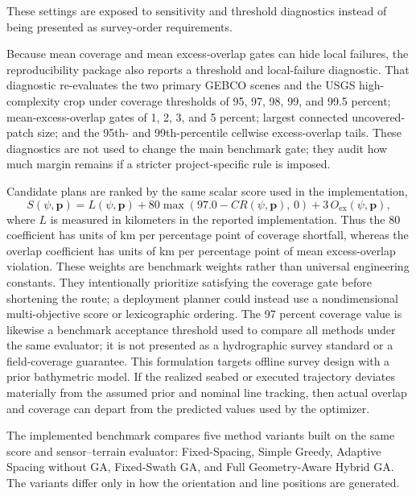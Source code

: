 \documentclass[jmse,article,submit,moreauthors]{Definitions/mdpi}
\begin{document}
These settings are exposed to sensitivity and threshold diagnostics instead of being presented as survey-order requirements.

Because mean coverage and mean excess-overlap gates can hide local failures, the reproducibility package also reports a threshold and local-failure diagnostic. That diagnostic re-evaluates the two primary GEBCO scenes and the USGS high-complexity crop under coverage thresholds of 95, 97, 98, 99, and 99.5 percent; mean-excess-overlap gates of 1, 2, 3, and 5 percent; largest connected uncovered-patch size; and the 95th- and 99th-percentile cellwise excess-overlap tails. These diagnostics are not used to change the main benchmark gate; they audit how much margin remains if a stricter project-specific rule is imposed.

Candidate plans are ranked by the same scalar score used in the implementation,
\begin{equation}
S(\psi,\mathbf{p})
=
L(\psi,\mathbf{p})
+ 80\max\!\left(97.0-CR(\psi,\mathbf{p}),\,0\right)
+ 3\,O_{\mathrm{ex}}(\psi,\mathbf{p}),
\label{eq:plan_score}
\end{equation}
where \(L\) is measured in kilometers in the reported implementation. Thus the 80 coefficient has units of km per percentage point of coverage shortfall, whereas the overlap coefficient has units of km per percentage point of mean excess-overlap violation. These weights are benchmark weights rather than universal engineering constants. They intentionally prioritize satisfying the coverage gate before shortening the route; a deployment planner could instead use a nondimensional multi-objective score or lexicographic ordering. The 97 percent coverage value is likewise a benchmark acceptance threshold used to compare all methods under the same evaluator; it is not presented as a hydrographic survey standard or a field-coverage guarantee. This formulation targets offline survey design with a prior bathymetric model. If the realized seabed or executed trajectory deviates materially from the assumed prior and nominal line tracking, then actual overlap and coverage can depart from the predicted values used by the optimizer.

The implemented benchmark compares five method variants built on the same score and sensor--terrain evaluator: Fixed-Spacing, Simple Greedy, Adaptive Spacing without GA, Fixed-Swath GA, and Full Geometry-Aware Hybrid GA. The variants differ only in how the orientation and line positions are generated.
\end{document}

